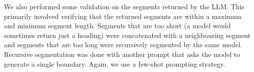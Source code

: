 




We also performed some validation on the segments returned by the LLM. This primarily involved verifying that the returned segments are within a maximum and minimum segment length. Segments that are too short (a model would sometimes return just a heading) were concatenated with a neighbouring segment and segments that are too long were recursively segmented by the same model. Recursive segmentation was done with another prompt that asks the model to generate a single boundary. Again, we use a few-shot prompting strategy.
